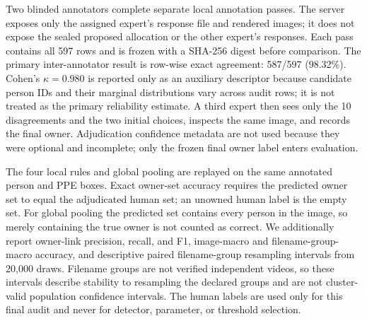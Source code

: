 \documentclass[iicol,pdflatex,sn-mathphys-num]{sn-jnl}
\begin{document}
Two blinded annotators complete separate local annotation passes. The server exposes only the assigned expert's response file and rendered images; it does not expose the sealed proposed allocation or the other expert's responses. Each pass contains all 597 rows and is frozen with a SHA-256 digest before comparison. The primary inter-annotator result is row-wise exact agreement: 587/597 (98.32\%). Cohen's $\kappa=0.980$ is reported only as an auxiliary descriptor because candidate person IDs and their marginal distributions vary across audit rows; it is not treated as the primary reliability estimate. A third expert then sees only the 10 disagreements and the two initial choices, inspects the same image, and records the final owner. Adjudication confidence metadata are not used because they were optional and incomplete; only the frozen final owner label enters evaluation.

The four local rules and global pooling are replayed on the same annotated person and PPE boxes. Exact owner-set accuracy requires the predicted owner set to equal the adjudicated human set; an unowned human label is the empty set. For global pooling the predicted set contains every person in the image, so merely containing the true owner is not counted as correct. We additionally report owner-link precision, recall, and F1, image-macro and filename-group-macro accuracy, and descriptive paired filename-group resampling intervals from 20,000 draws. Filename groups are not verified independent videos, so these intervals describe stability to resampling the declared groups and are not cluster-valid population confidence intervals. The human labels are used only for this final audit and never for detector, parameter, or threshold selection.
\end{document}
